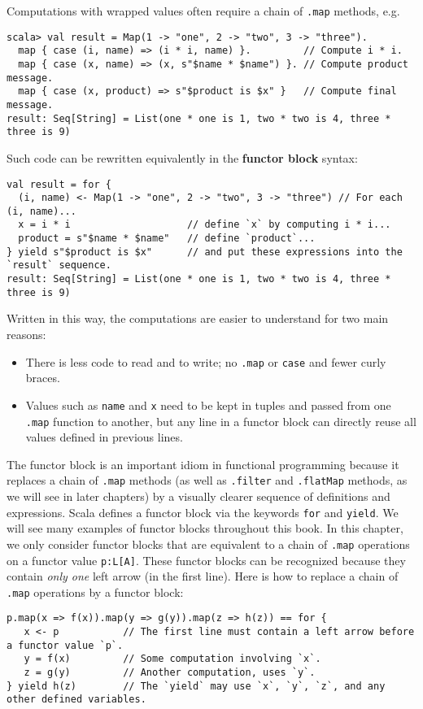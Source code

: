 Computations with wrapped values often require a chain of \lstinline!.map!
methods, e.g.
\begin{lstlisting}
scala> val result = Map(1 -> "one", 2 -> "two", 3 -> "three").
  map { case (i, name) => (i * i, name) }.         // Compute i * i.
  map { case (x, name) => (x, s"$name * $name") }. // Compute product message.
  map { case (x, product) => s"$product is $x" }   // Compute final message.
result: Seq[String] = List(one * one is 1, two * two is 4, three * three is 9)
\end{lstlisting}
Such code can be rewritten equivalently in the \textbf{functor
block} syntax:
\begin{lstlisting}
val result = for {
  (i, name) <- Map(1 -> "one", 2 -> "two", 3 -> "three") // For each (i, name)...
  x = i * i                    // define `x` by computing i * i...
  product = s"$name * $name"   // define `product`...
} yield s"$product is $x"      // and put these expressions into the `result` sequence.
result: Seq[String] = List(one * one is 1, two * two is 4, three * three is 9) 
\end{lstlisting}
Written in this way, the computations are easier to understand for
two main reasons:
\begin{itemize}
\item There is less code to read and to write; no \lstinline!.map! or \lstinline!case!
and fewer curly braces.
\item Values such as \lstinline!name! and \lstinline!x! need to be kept
in tuples and passed from one \lstinline!.map! function to another,
but any line in a functor block can directly reuse all values defined
in previous lines.
\end{itemize}
The functor block is an important idiom in functional programming
because it replaces a chain of \lstinline!.map! methods (as well
as \lstinline!.filter! and \lstinline!.flatMap! methods, as we will
see in later chapters) by a visually clearer sequence of definitions
and expressions. Scala defines a functor block via the keywords \lstinline!for!
and \lstinline!yield!. We will see many examples of functor blocks
throughout this book. In this chapter, we only consider functor blocks
that are equivalent to a chain of \lstinline!.map! operations on
a functor value \lstinline!p:L[A]!. These functor blocks can be recognized
because they contain \emph{only one} left arrow (in the first line).
Here is how to replace a chain of \lstinline!.map! operations by
a functor block:
\begin{lstlisting}
p.map(x => f(x)).map(y => g(y)).map(z => h(z)) == for {
   x <- p           // The first line must contain a left arrow before a functor value `p`.
   y = f(x)         // Some computation involving `x`.
   z = g(y)         // Another computation, uses `y`.
} yield h(z)        // The `yield` may use `x`, `y`, `z`, and any other defined variables.
\end{lstlisting}
